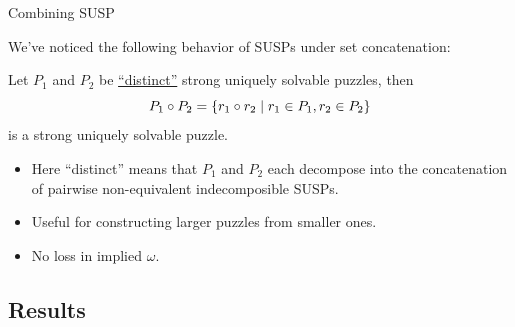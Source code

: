 \documentclass[t,10pt,
mathserif,xcolor=dvipsnames]{beamer}
\begin{document}
\begin{myframe}{Combining SUSP}
   

  We've noticed the following behavior of SUSPs under set concatenation:
  
  \begin{obs}[Experimental]
    Let $P_1$ and $P_2$ be \uline{``distinct''} strong uniquely solvable
    puzzles, then
    $$P_1 \circ P_2 = \{{{r_1 \circ r_2}\;|\;{r_1 \in P_1, r_2 \in
      P_2}}\}$$ is a strong uniquely solvable puzzle.
  \end{obs}

  \begin{itemize}
  \item Here ``distinct'' means that $P_1$ and $P_2$ each decompose
    into the concatenation of pairwise non-equivalent indecomposible
    SUSPs.
  \item Useful for constructing larger puzzles from smaller ones.
  \item No loss in implied $\omega$.
  \end{itemize}


  
\end{myframe}



\subsection{Results}
\end{document}
